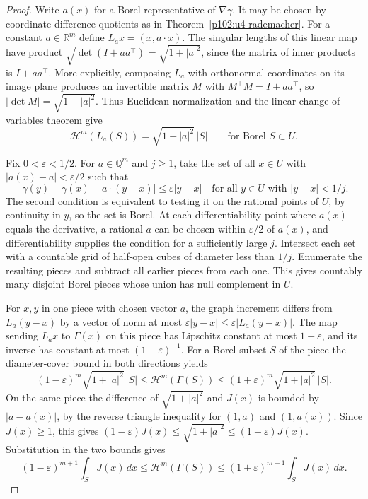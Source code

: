 \documentclass[11pt,oneside,openany]{book}
\theoremstyle{definition}
\theoremstyle{remark}
\begin{document}
\begin{proof}
Write \(a(x)\) for a Borel representative of \(\nabla\gamma\).
It may be chosen by coordinate difference quotients as in
Theorem~\ref{p102:u4-rademacher}. For a constant \(a\in\mathbb R^m\)
define \(L_a x=(x,a\cdot x)\). The singular lengths of this
linear map have product \(\sqrt{\det(I+aa^\top)}
=\sqrt{1+|a|^2}\), since the matrix of inner products is
\(I+aa^\top\). More explicitly, composing \(L_a\) with
orthonormal coordinates on its image plane produces an invertible
matrix \(M\) with \(M^\top M=I+aa^\top\), so
\(|\det M|=\sqrt{1+|a|^2}\). Thus Euclidean normalization and
the linear change-of-variables theorem
\cite[Chapter~9, Linear Jacobian]{d11} give
\[
 \mathcal H^m(L_a(S))=\sqrt{1+|a|^2}\,|S|
 \qquad\text{for Borel }S\subset U .
\]

Fix \(0<\varepsilon<1/2\). For \(a\in\mathbb Q^m\) and
\(j\geq1\), take the set of all \(x\in U\) with
\(|a(x)-a|<\varepsilon/2\) such that
\[
 |\gamma(y)-\gamma(x)-a\cdot(y-x)|
    \leq\varepsilon |y-x|
 \quad\text{for all }y\in U\text{ with }|y-x|<1/j.
\]
The second condition is equivalent to testing it on the rational
points of \(U\), by continuity in \(y\), so the set is Borel.
At each differentiability point where \(a(x)\) equals the
derivative, a rational \(a\) can be chosen within
\(\varepsilon/2\) of \(a(x)\), and differentiability supplies
the condition for a sufficiently large \(j\). Intersect each
set with a countable grid of half-open cubes of diameter less
than \(1/j\). Enumerate the resulting pieces and subtract all
earlier pieces from each one. This gives countably many disjoint
Borel pieces whose union has null complement in \(U\).

For \(x,y\) in one piece with chosen vector \(a\), the graph
increment differs from \(L_a(y-x)\) by a vector of norm at most
\(\varepsilon|y-x|\leq\varepsilon|L_a(y-x)|\). The map sending
\(L_a x\) to \(\Gamma(x)\) on this piece has Lipschitz constant
at most \(1+\varepsilon\), and its inverse has constant at most
\((1-\varepsilon)^{-1}\). For a Borel subset \(S\) of the piece
the diameter-cover bound in both directions yields
\[
 (1-\varepsilon)^m\sqrt{1+|a|^2}\,|S|
 \leq\mathcal H^m(\Gamma(S))
 \leq(1+\varepsilon)^m\sqrt{1+|a|^2}\,|S| .
\]
On the same piece the difference of
\(\sqrt{1+|a|^2}\) and \(J(x)\) is bounded by \(|a-a(x)|\),
by the reverse triangle inequality for \((1,a)\) and
\((1,a(x))\). Since \(J(x)\geq1\), this gives
\((1-\varepsilon)J(x)\leq\sqrt{1+|a|^2}\leq(1+\varepsilon)J(x)\).
Substitution in the two bounds gives
\[
 (1-\varepsilon)^{m+1}\int_S J(x)\,dx
 \leq\mathcal H^m(\Gamma(S))
 \leq(1+\varepsilon)^{m+1}\int_S J(x)\,dx .
\]


\end{proof}
\end{document}
